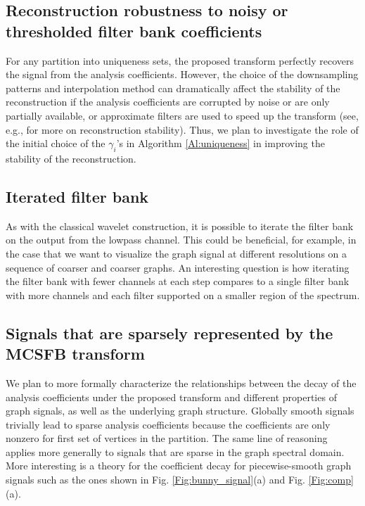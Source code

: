 \documentclass[journal, 10pt]{IEEEtran}
\begin{document}
\subsection{Reconstruction robustness to noisy or thresholded filter bank coefficients} \label{Se:noisy_ext}
For any partition into uniqueness sets, the proposed transform perfectly recovers the signal from the analysis coefficients. However, the choice of the downsampling patterns and interpolation method can dramatically affect the stability of the reconstruction if the analysis coefficients are corrupted by noise or are only partially available, or approximate filters are used to speed up the transform (see, e.g., \cite[Section III.B]{anis2016efficient} for more on reconstruction stability). Thus, we plan to investigate the role of the initial choice of the $\gamma_i$'s in Algorithm \ref{Al:uniqueness} in improving the stability of the reconstruction.

\subsection{Iterated filter bank} 
As with the classical wavelet construction, it is possible to iterate the filter bank on the output from the lowpass channel.
This could be beneficial, for example, in the case that we want to visualize the graph signal at different resolutions on  a sequence of coarser and coarser graphs. An interesting question is how iterating the filter bank with fewer channels at each step compares to a single filter bank with more channels and each filter supported on a smaller region of the spectrum.

\subsection{Signals that are sparsely represented by the MCSFB transform}
We  plan to more formally characterize the relationships between the decay of the analysis coefficients under the proposed transform and different properties of graph signals, as well as the underlying graph structure.
Globally smooth signals trivially lead to sparse analysis coefficients because the coefficients are only nonzero for first set of vertices in the partition. The same line of reasoning applies more generally to signals that are sparse in the graph spectral domain. More interesting is a theory for the coefficient decay for piecewise-smooth graph signals such as the ones shown in Fig. \ref{Fig:bunny_signal}(a) and Fig. \ref{Fig:comp}(a).

\balance

{\small }
\end{document}
